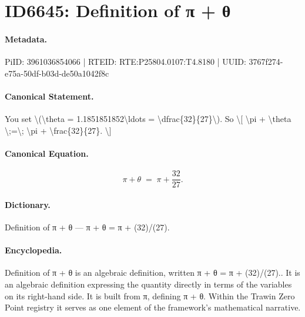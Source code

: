 \section*{ID6645: Definition of π + θ}
\paragraph{Metadata.}
PiID: 3961036854066 | RTEID: RTE:P25804.0107:T4.8180 | UUID: 3767f274-e75a-50df-b03d-de50a1042f8c

\paragraph{Canonical Statement.}
You set \textbackslash{}(\textbackslash{}theta = 1.1851851852\textbackslash{}ldots = \textbackslash{}dfrac\{32\}\{27\}\textbackslash{}). So \textbackslash{}[ \textbackslash{}pi + \textbackslash{}theta \textbackslash{};=\textbackslash{}; \textbackslash{}pi + \textbackslash{}frac\{32\}\{27\}. \textbackslash{}]

\paragraph{Canonical Equation.}
\[
\pi + \theta \;=\; \pi + \frac{32}{27}.
\]

\paragraph{Dictionary.}
Definition of π + θ — π + θ = π + (32)/(27).

\paragraph{Encyclopedia.}
Definition of π + θ is an algebraic definition, written π + θ = π + (32)/(27).. It is an algebraic definition expressing the quantity directly in terms of the variables on its right-hand side. It is built from π, defining π + θ. Within the Trawin Zero Point registry it serves as one element of the framework's mathematical narrative.
